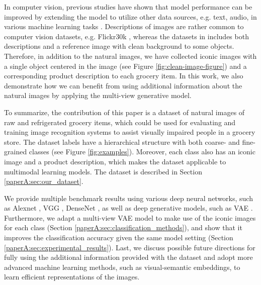 In computer vision, previous studies have shown that model performance can be improved by extending the model to utilize other data sources, e.g. text, audio, in various machine learning tasks . Descriptions of images are rather common to computer vision datasets, e.g. Flickr30k , whereas the datasets in  includes both descriptions and a reference image with clean background to some objects. Therefore, in addition to the natural images, we have collected iconic images with a single object centered in the image (see Figure \ref{fig:clean-image-figure}) and a corresponding product description to each grocery item. In this work, we also demonstrate how we can benefit from using additional information about the natural images by applying the multi-view generative model.

To summarize, the contribution of this paper is a dataset of natural images of raw and refrigerated grocery items, which could be used for evaluating and training image recognition systems to assist visually impaired people in a grocery store. 
The dataset labels have a hierarchical structure with both coarse- and fine-grained classes (see Figure \ref{fig:examples}). Moreover, 
each class also has an iconic image and a product description, which makes the dataset applicable to multimodal learning models. The dataset is described in Section \ref{paperA:sec:our_dataset}. 

We provide multiple benchmark results using various deep neural networks, such as Alexnet , VGG , DenseNet , as well as deep generative models, such as VAE . 
Furthermore, we adapt a multi-view VAE model to make use of the iconic images for each class (Section \ref{paperA:sec:classification_methods}), and show that it improves the classification accuracy given the same model setting (Section \ref{paperA:sec:experimental_results}). Last, we discuss possible future directions for fully using the additional information provided with the dataset and adopt more advanced machine learning methods, such as visual-semantic embeddings, to learn efficient representations of the images. 